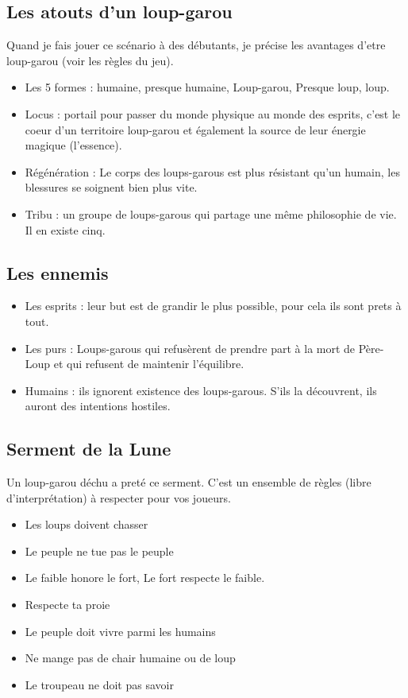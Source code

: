 \documentclass[oneside,12pt]{book}
\begin{document}
\begin{flushleft}
\subsection{Les atouts d'un loup-garou}
Quand je fais jouer ce scénario à des débutants, je précise les avantages d'etre loup-garou (voir les règles du jeu).
\begin{itemize}
\item Les 5 formes : humaine, presque humaine, Loup-garou, Presque loup, loup.
\item Locus : portail pour passer du monde physique au monde des esprits, c'est le coeur d'un territoire loup-garou et également la source de leur énergie magique (l'essence). 
\item Régénération : Le corps des loups-garous est plus résistant qu'un humain, les blessures se soignent bien plus vite.
\item Tribu : un groupe de loups-garous qui partage une même philosophie de vie. Il en existe cinq.
\end{itemize}

\subsection{Les ennemis}
\begin{itemize}
\item Les esprits : leur but est de grandir le plus possible, pour cela ils sont prets à tout. 
\item Les purs : Loups-garous qui refusèrent de prendre part à la mort de Père-Loup et qui refusent de maintenir l'équilibre.
\item Humains : ils ignorent existence des loups-garous. S’ils la découvrent, ils auront des intentions hostiles.
\end{itemize}


\subsection{Serment de la Lune}
Un loup-garou déchu a preté ce serment. C'est un ensemble de règles (libre d'interprétation) à respecter pour vos joueurs.
\begin{itemize}
\item Les loups doivent chasser
\item Le peuple ne tue pas le peuple
\item Le faible honore le fort, Le fort respecte le faible.
\item Respecte ta proie
\item Le peuple doit vivre parmi les humains
\item Ne mange pas de chair humaine ou de loup
\item Le troupeau ne doit pas savoir
\end{itemize}


\end{flushleft}
\end{document}
